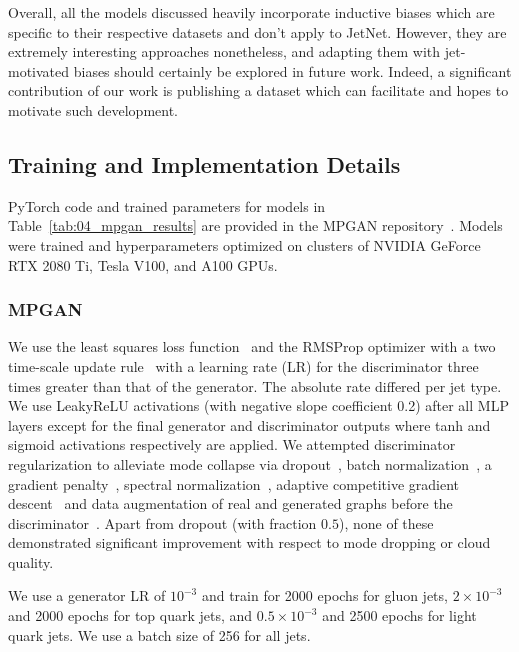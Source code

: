 Overall, all the models discussed heavily incorporate inductive biases which are specific to their respective datasets and don't apply to JetNet.
However, they are extremely interesting approaches nonetheless, and adapting them with jet-motivated biases should certainly be explored in future work. 
Indeed, a significant contribution of our work is publishing a dataset which can facilitate and hopes to motivate such development.

\subsection{Training and Implementation Details}
\label{app:04_mpgan_training}

PyTorch code and trained parameters for models in Table~\ref{tab:04_mpgan_results} are provided in the MPGAN repository~\cite{mpgancode}. 
Models were trained and hyperparameters optimized on clusters of NVIDIA GeForce RTX 2080 Ti, Tesla V100, and A100 GPUs. 

\subsubsection{MPGAN}

We use the least squares loss function~\cite{mao_lsgan} and the RMSProp optimizer with a two time-scale update rule~\cite{TTUR} with a learning rate (LR) for the discriminator three times greater than that of the generator. The absolute rate differed per jet type. 
We use LeakyReLU activations (with negative slope coefficient 0.2) after all MLP layers except for the final generator and discriminator outputs where tanh and sigmoid activations respectively are applied. 
We attempted discriminator regularization to alleviate mode collapse via dropout~\cite{srivastava2014dropout}, batch normalization~\cite{ioffe2015batch}, a gradient penalty~\cite{wgangp}, spectral normalization~\cite{spectralnorm}, adaptive competitive gradient descent~\cite{acgd} and data augmentation of real and generated graphs before the discriminator~\cite{karras_2020, tran_2020, zhao_2020}.
Apart from dropout (with fraction $0.5$), none of these demonstrated significant improvement with respect to mode dropping or cloud quality.

We use a generator LR of $10^{-3}$ and train for 2000 epochs for gluon jets, $2\times10^{-3}$ and 2000 epochs for top quark jets, and $0.5\times10^{-3}$ and 2500 epochs for light quark jets. 
We use a batch size of 256 for all jets. 

